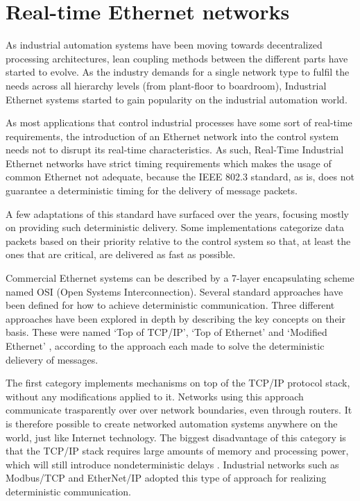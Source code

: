 \section{Real-time Ethernet networks}\label{sec:rt-networks}

As industrial automation systems have been moving towards decentralized processing architectures, lean coupling methods between the different parts have started to evolve.
As the industry demands for a single network type to fulfil the needs across all hierarchy levels (from plant-floor to boardroom), Industrial Ethernet systems started to gain popularity on the industrial automation world.

As most applications that control industrial processes have some sort of real-time requirements, the introduction of an Ethernet network into the control system needs not to disrupt its real-time characteristics.
As such, Real-Time Industrial Ethernet networks have strict timing requirements which makes the usage of common Ethernet not adequate, because the IEEE 802.3 standard, as is, does not guarantee a deterministic timing for the delivery of message packets.

A few adaptations of this standard have surfaced over the years, focusing mostly on providing such deterministic delivery.
Some implementations categorize data packets based on their priority relative to the control system so that, at least the ones that are critical, are delivered as fast as possible.

Commercial Ethernet systems can be described by a 7-layer encapsulating scheme named OSI (Open Systems Interconnection).
Several standard approaches have been defined for how to achieve deterministic communication.
Three different approaches have been explored in depth by describing the key concepts on their basis.
These were named `Top of TCP/IP', `Top of Ethernet' and `Modified Ethernet' \cite{rte:rte-for-automation}, according to the approach each made to solve the deterministic delievery of messages.

The first category implements mechanisms on top of the TCP/IP protocol stack, without any modifications applied to it.
Networks using this approach communicate trasparently over over network boundaries, even through routers.
It is therefore possible to create networked automation systems anywhere on the world, just like Internet technology.
The biggest disadvantage of this category is that the TCP/IP stack requires large amounts of memory and processing power, which will still introduce nondeterministic delays \cite{rte:rte-for-automation}.
Industrial networks such as Modbus/TCP and EtherNet/IP \cite{protocol:ethernetip} adopted this type of approach for realizing deterministic communication.


